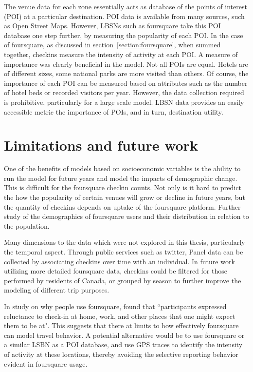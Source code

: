 The venue data for each zone essentially acts as database of the points of interest (POI) at a particular destination. POI data is available from many sources, such as Open Street Maps. However, LBSNs such as foursquare take this POI database one step further, by measuring the popularity of each POI. In the case of foursquare, as discussed in section~\ref{section:foursquare}, when summed together, checkins measure the intensity of activity at each POI. A measure of importance was clearly beneficial in the model. Not all POIs are equal. Hotels are of different sizes, some national parks are more visited than others. Of course, the importance of each POI can be measured based on attributes such as the number of hotel beds or recorded visitors per year. However, the data collection required is prohibitive, particularly for a large scale model. LBSN data provides an easily accessible metric the importance of POIs, and in turn, destination utility. 

\section{Limitations and future work}
One of the benefits of models based on socioeconomic variables is the ability to run the model for future years and model the impacts of demographic change. This is difficult for the foursquare checkin counts. Not only is it hard to predict the how the popularity of certain venues will grow or decline in future years, but the quantity of checkins depends on uptake of the foursquare platform. Further study of the demographics of foursquare users and their distribution in relation to the population. 

Many dimensions to the data which were not explored in this thesis,  particularly the temporal aspect. Through public services such as twitter, Panel data can be collected by associating checkins over time with an individual. In future work utilizing more detailed foursquare data, checkins could be filtered for those performed by residents of Canada, or grouped by season to further improve the modeling of different trip purposes.

In study on why people use foursquare, \textcite{lindqvist2011m} found that ``participants expressed reluctance to check-in at home, work, and other places that one might expect them to be at". This suggests that there at limits to how effectively foursquare can model travel behavior. A potential alternative would be to use foursquare or a similar LSBN as a POI database, and use GPS traces to identify the intensity of activity at these locations, thereby avoiding the selective reporting behavior evident in foursquare usage.


